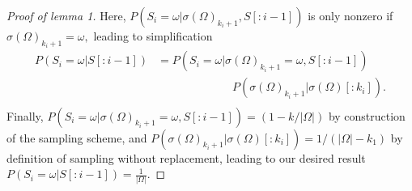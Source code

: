 \documentclass[9pt,twocolumn,twoside,lineno]{gsajnl}
\begin{document}
\begin{proof} [Proof of lemma 1]
Here, $P(S_i = \omega |\sigma(\Omega)_{k_i+1} , S[:i-1] )$ is only nonzero if $\sigma(\Omega)_{k_i+1} = \omega,$ leading to simplification
\begin{equation}
\begin{split}
P(S_i = \omega |S[:i-1]  )&=P(S_i = \omega |\sigma(\Omega)_{k_i+1} =\omega, S[:i-1] )\\
&~~~~~~~~~~~~~~~~~~~~~~~~~~~~~~P(\sigma(\Omega)_{k_i+1}  |\sigma(\Omega)[:k_i] ).\\
\end{split}
\end{equation}
Finally, $P(S_i = \omega |\sigma(\Omega)_{k_i+1} =\omega, S[:i-1] ) = (1-k/|\Omega|)$ by construction of the sampling scheme, and $P(\sigma(\Omega)_{k_i+1} |\sigma(\Omega)[:k_i] ) =1/(|\Omega| - k_1)$ by definition of sampling without replacement, leading to our desired result   $P(S_i = \omega |S[:i-1]  ) = \frac{1}{|\Omega|}$.
\end{proof}
\end{document}
